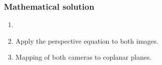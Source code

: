 \documentclass[10pt,a4paper]{scrartcl}
\begin{document}
\begin{multicols*}{2}
\subsubsection{Mathematical solution}

\begin{enumerate}
\item {}
\item Apply the perspective equation to both images.


\item Mapping of both cameras to coplanar planes.


\end{enumerate}
\end{multicols*}
\end{document}

